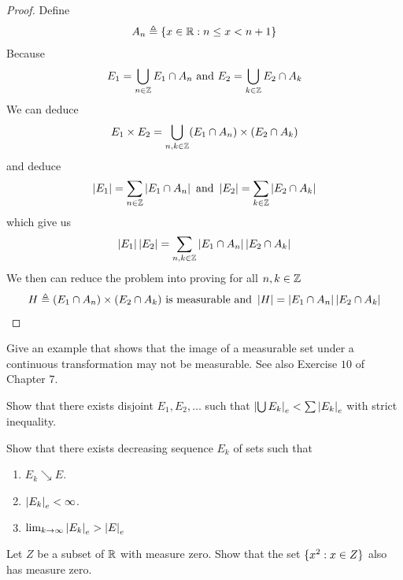 \documentclass{report}
\begin{document}
\begin{proof}
Define 
\begin{align*}
A_n\triangleq \{ x\in\mathbb{R}: n\leq x< n+1 \}
\end{align*}
Because 
\begin{align*}
E_1= \bigcup_{n\in\mathbb{Z}} E_1 \cap A_n\text{ and }E_2=\bigcup_{k\in\mathbb{Z}} E_2 \cap A_k
\end{align*}
We can deduce
\begin{align*}
E_1 \times E_2 = \bigcup_{n,k\in\mathbb{Z}} (E_1 \cap A_n)\times (E_2 \cap A_k)
\end{align*}
and deduce 
\begin{align*}
\left|E_1\right|= \sum_{n\in\mathbb{Z}} \left|E_1\cap A_n\right|\text{ and }\left|E_2\right|=\sum_{k\in\mathbb{Z}} \left|E_2\cap A_k\right|
\end{align*}
which give us 
\begin{align*}
\left|E_1\right|\left|E_2\right|=\sum_{n,k\in\mathbb{Z}} \left|E_1\cap A_n\right| \left|E_2\cap A_k\right|
\end{align*}
We then can reduce the problem into proving for all $n,k\in\mathbb{Z}$
\begin{align*}
  H\triangleq (E_1\cap A_n) \times (E_2\cap A_k)\text{ is measurable and }\left|H\right|= \left|E_1 \cap A_n\right| \left|E_2 \cap A_k\right|
\end{align*}





\end{proof}
\begin{question}{}{}
Give an example that shows that the image of a measurable set under a continuous transformation may not be measurable. See also Exercise $10$ of Chapter 7. 
\end{question}
\begin{question}{}{}
Show that there exists disjoint $E_1,E_2,\dots $ such that $\left|\bigcup E_k\right|_e< \sum \left|E_k\right|_e$ with strict inequality. 
\end{question}
\begin{question}{}{}
Show that there exists decreasing sequence $E_k$ of sets such that 
\begin{enumerate}[label=(\alph*)]
  \item $E_k\searrow E$.
  \item $\left|E_k\right|_e<\infty$.
  \item $\lim_{k\to \infty}\left|E_k\right|_e> \left|E\right|_e$
\end{enumerate}
\end{question}
\begin{question}{}{}
Let $Z$ be a subset of $\mathbb{R}$ with measure zero. Show that the set $\{ x^2:x\in Z \}$ also has measure zero.
\end{question}
\end{document}
